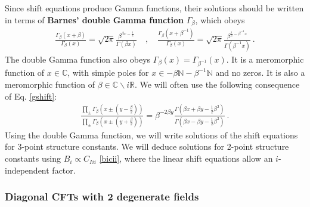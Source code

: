 \documentclass[12pt, a4paper]{article}
\theoremstyle{break}
\begin{document}
Since shift equations produce Gamma functions, their solutions should be written in terms of \textbf{Barnes' double Gamma function} $\Gamma_\beta$, which obeys
\begin{align}
\frac{\Gamma_\beta(x+\beta)}{\Gamma_\beta(x)} = \sqrt{2\pi}\frac{\beta^{\beta x-\frac12}}{\Gamma(\beta x)}
\quad , \quad 
\frac{\Gamma_\beta(x+\beta^{-1})}{\Gamma_\beta(x)} = \sqrt{2\pi}\frac{\beta^{\frac12-\beta^{-1}x}}{\Gamma(\beta^{-1}x)} \ .
\label{gshift}
\end{align}
The double Gamma function also obeys $\Gamma_\beta(x)= \Gamma_{\beta^{-1}}(x)$. It is a meromorphic function of $x\in\mathbb{C}$, with simple poles for $x\in -\beta\mathbb{N}-\beta^{-1}\mathbb{N}$ and no zeros. It is also a meromorphic function of $\beta\in \mathbb{C}\backslash i\mathbb{R}$. We will often use the following consequence of Eq. \eqref{gshift}:
\begin{align}
 \frac{\prod_\pm \Gamma_\beta\left(x \pm (y-\frac{\beta}{2})\right)}{\prod_\pm \Gamma_\beta\left(x \pm (y+\frac{\beta}{2})\right)} = \beta^{-2\beta y}\frac{\Gamma\left(\beta x+\beta y - \frac12 \beta^2\right)}{\Gamma\left(\beta x-\beta y -\frac12 \beta^2\right)}\ . 
\end{align}
Using the double Gamma function, we will write solutions of the shift equations for 3-point structure constants. We will deduce solutions for 2-point structure constants using $B_i\propto C_{Iii}$ \eqref{bicii}, where the linear shift equations allow an $i$-independent factor. 

\subsubsection{Diagonal CFTs with 2 degenerate fields}
\end{document}
